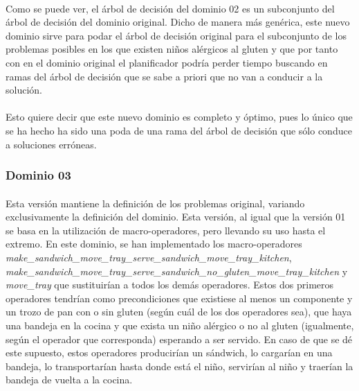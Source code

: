 \documentclass{article}
\begin{document}
\paragraph{}
Como se puede ver, el árbol de decisión del dominio 02 es un subconjunto del árbol de decisión del dominio original. Dicho de manera más genérica, este nuevo dominio sirve para podar el árbol de decisión original para el subconjunto de los problemas posibles en los que existen niños alérgicos al gluten y que por tanto con en el dominio original el planificador podría perder tiempo buscando en ramas del árbol de decisión que se sabe a priori que no van a conducir a la solución.

\paragraph{}
Esto quiere decir que este nuevo dominio es completo y óptimo, pues lo único que se ha hecho ha sido una poda de una rama del árbol de decisión que sólo conduce a soluciones erróneas.

\subsubsection{Dominio 03}

\paragraph{}
Esta versión mantiene la definición de los problemas original, variando exclusivamente la definición del dominio. Esta versión, al igual que la versión 01 se basa en la utilización de macro-operadores, pero llevando su uso hasta el extremo. En este dominio, se han implementado los macro-operadores \\ \textit{ make\_sandwich\_move\_tray\_serve\_sandwich\_move\_tray\_kitchen}, \\ \textit{make\_sandwich\_move\_tray\_serve\_sandwich\_no\_gluten\_move\_tray\_kitchen} y \\ \textit{move\_tray} que sustituirían a todos los demás operadores. Estos dos primeros operadores tendrían como precondiciones que existiese al menos un componente y un trozo de pan con o sin gluten (según cuál de los dos operadores sea), que haya una bandeja en la cocina y que exista un niño alérgico o no al gluten (igualmente, según el operador que corresponda) esperando a ser servido. En caso de que se dé este supuesto, estos operadores producirían un sándwich, lo cargarían en una bandeja, lo transportarían hasta donde está el niño, servirían al niño y traerían la bandeja de vuelta a la cocina.
\end{document}
